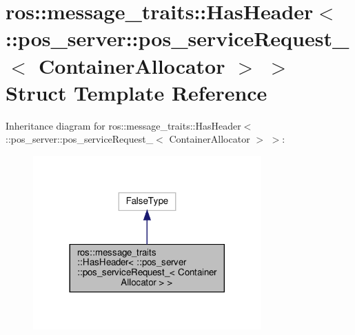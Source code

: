 \hypertarget{structros_1_1message__traits_1_1HasHeader_3_01_1_1pos__server_1_1pos__serviceRequest___3_01ContainerAllocator_01_4_01_4}{}\section{ros\+:\+:message\+\_\+traits\+:\+:Has\+Header$<$ \+:\+:pos\+\_\+server\+:\+:pos\+\_\+service\+Request\+\_\+$<$ Container\+Allocator $>$ $>$ Struct Template Reference}
\label{structros_1_1message__traits_1_1HasHeader_3_01_1_1pos__server_1_1pos__serviceRequest___3_01ContainerAllocator_01_4_01_4}


Inheritance diagram for ros\+:\+:message\+\_\+traits\+:\+:Has\+Header$<$ \+:\+:pos\+\_\+server\+:\+:pos\+\_\+service\+Request\+\_\+$<$ Container\+Allocator $>$ $>$\+:
\nopagebreak
\begin{figure}[H]
\begin{center}
\leavevmode
\includegraphics[width=248pt]{structros_1_1message__traits_1_1HasHeader_3_01_1_1pos__server_1_1pos__serviceRequest___3_01Conta639d327203443f0f5a1f273d7462b03d}
\end{center}
\end{figure}


